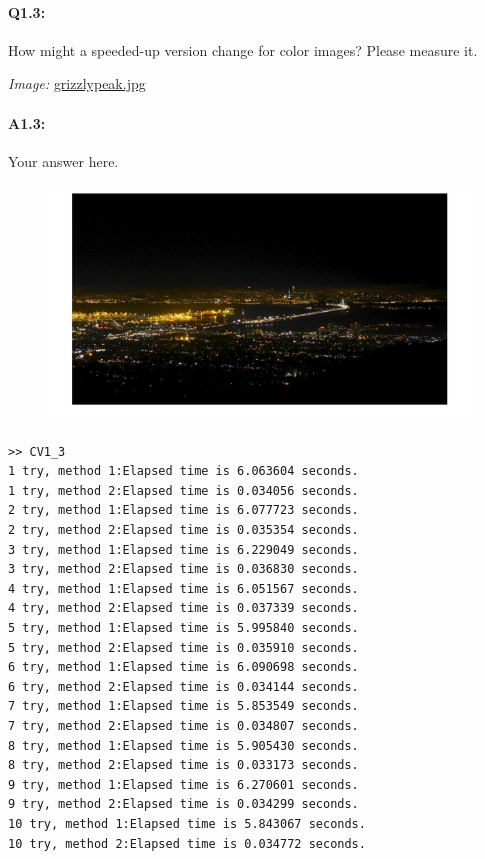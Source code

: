 \documentclass[11pt]{article}
\begin{document}

\pagebreak
\paragraph{Q1.3:} How might a speeded-up version change for color images? Please measure it.

\emph{Image:} \href{grizzlypeak.jpg}{grizzlypeak.jpg}

\paragraph{A1.3:} Your answer here.

\begin{figure}[h]

\centering

\includegraphics[width=1\textwidth]{P1_3.jpg}

\end{figure}

\begin{verbatim}
>> CV1_3
1 try, method 1:Elapsed time is 6.063604 seconds.
1 try, method 2:Elapsed time is 0.034056 seconds.
2 try, method 1:Elapsed time is 6.077723 seconds.
2 try, method 2:Elapsed time is 0.035354 seconds.
3 try, method 1:Elapsed time is 6.229049 seconds.
3 try, method 2:Elapsed time is 0.036830 seconds.
4 try, method 1:Elapsed time is 6.051567 seconds.
4 try, method 2:Elapsed time is 0.037339 seconds.
5 try, method 1:Elapsed time is 5.995840 seconds.
5 try, method 2:Elapsed time is 0.035910 seconds.
6 try, method 1:Elapsed time is 6.090698 seconds.
6 try, method 2:Elapsed time is 0.034144 seconds.
7 try, method 1:Elapsed time is 5.853549 seconds.
7 try, method 2:Elapsed time is 0.034807 seconds.
8 try, method 1:Elapsed time is 5.905430 seconds.
8 try, method 2:Elapsed time is 0.033173 seconds.
9 try, method 1:Elapsed time is 6.270601 seconds.
9 try, method 2:Elapsed time is 0.034299 seconds.
10 try, method 1:Elapsed time is 5.843067 seconds.
10 try, method 2:Elapsed time is 0.034772 seconds.
\end{verbatim}
\end{document}
